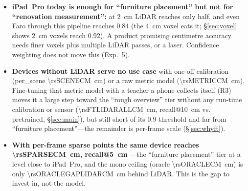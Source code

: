 \begin{itemize}
\item \textbf{iPad~Pro today is enough for ``furniture placement'' but not for ``renovation measurement'':} at
\SI{2}{cm} LiDAR reaches only half, and even Faro through this pipeline reaches 0.84 (the \SI{4}{cm} voxel eats it;
\S\ref{sec:voxel} shows \SI{2}{cm} voxels reach 0.92). A product promising centimetre accuracy needs finer voxels plus multiple
LiDAR passes, or a laser. Confidence weighting does not move this (Exp.~5).
\item \textbf{Devices without LiDAR serve no use case} with one-off calibration (per\_scene \SI{\rsSCENECM}{cm}) or a
raw metric model (\SI{\rsMETRICCM}{cm}). Fine-tuning that metric model with a teacher a phone collects itself (R3) moves it
a large step toward the ``rough overview'' tier without any run-time calibration or sensor (\SI{\rsFTLIDARALLCM}{cm},
recall@\SI{10}{cm} \rsFTLIDARALLRten{} vs.\ \rsMETRICRten{} pretrained, \S\ref{sec:main}), but still short of its
0.9 threshold and far from ``furniture placement''---the remainder is per-frame scale (\S\ref{sec:whyft}).
\item \textbf{With per-frame sparse points the same device reaches \SI{\rsSPARSECM}{cm}, recall@\SI{5}{cm} \rsSPARSERfive}---the
``furniture placement'' tier at a level close to iPad~Pro, and the mono ceiling (oracle \SI{\rsORACLECM}{cm}) is only
\SI{\rsORACLEGAPLIDARCM}{cm} behind LiDAR. This is the gap to invest in, not the model.
\end{itemize}

